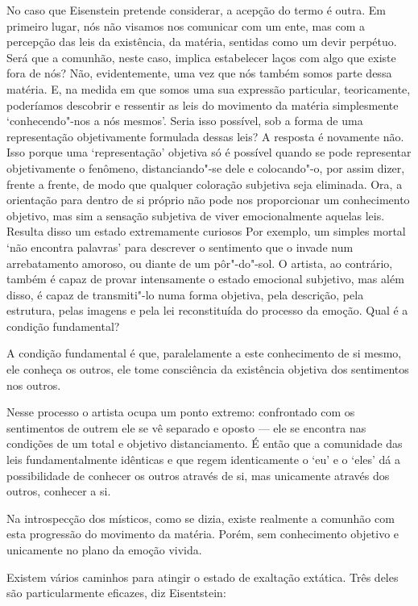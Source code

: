 No caso que Eisenstein pretende considerar, a acepção do termo é outra.
Em primeiro lugar, nós não visamos nos comunicar com um ente, mas com a
percepção das leis da existência, da matéria, sentidas como um devir
perpétuo. Será que a comunhão, neste caso, implica estabelecer laços com
algo que existe fora de nós? Não, evidentemente, uma vez que nós também
somos parte dessa matéria. E, na medida em que somos uma sua expressão
particular, teoricamente, poderíamos descobrir e ressentir as leis do
movimento da matéria simplesmente `conhecendo"-nos a nós mesmos'. Seria
isso possível, sob a forma de uma representação objetivamente formulada
dessas leis? A resposta é novamente não. Isso porque uma `representação'
objetiva só é possível quando se pode representar objetivamente o
fenômeno, distanciando"-se dele e colocando"-o, por assim dizer, frente a
frente, de modo que qualquer coloração subjetiva seja eliminada. Ora, a
orientação para dentro de si próprio não pode nos proporcionar um
conhecimento objetivo, mas sim a sensação subjetiva de viver
emocionalmente aquelas leis. Resulta disso um estado extremamente
curiosos Por exemplo, um simples mortal `não encontra palavras' para
descrever o sentimento que o invade num arrebatamento amoroso, ou diante
de um pôr"-do"-sol. O artista, ao contrário, também é capaz de provar
intensamente o estado emocional subjetivo, mas além disso, é capaz de
transmiti"-lo numa forma objetiva, pela descrição, pela estrutura, pelas
imagens e pela lei reconstituída do processo da emoção. Qual é a
condição fundamental?

A condição fundamental é que, paralelamente a este conhecimento de si
mesmo, ele conheça os outros, ele tome consciência da existência
objetiva dos sentimentos nos outros.

Nesse processo o artista ocupa um ponto extremo: confrontado com os
sentimentos de outrem ele se vê separado e oposto --- ele se encontra nas
condições de um total e objetivo distanciamento. É então que a
comunidade das leis fundamentalmente idênticas e que regem identicamente
o `eu' e o `eles' dá a possibilidade de conhecer os outros através de
si, mas unicamente através dos outros, conhecer a si.

Na introspecção dos místicos, como se dizia, existe realmente a comunhão
com esta progressão do movimento da matéria. Porém, sem conhecimento
objetivo e unicamente no plano da emoção vivida.

Existem vários caminhos para atingir o estado de exaltação extática.
Três deles são particularmente eficazes, diz Eisentstein:


